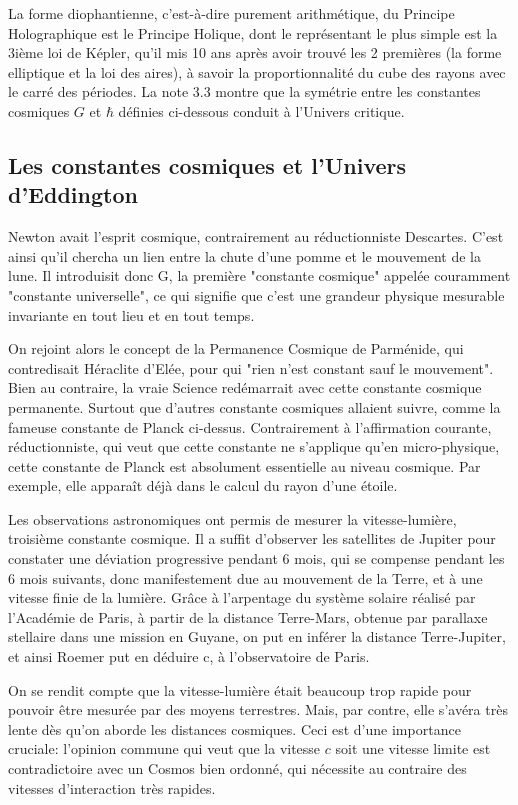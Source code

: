\documentclass[a4paper,12pt]{article}
\begin{document}
La forme diophantienne, c'est-à-dire purement arithmétique, du Principe Holographique est le Principe Holique, dont le représentant le plus simple est la 3ième loi de Képler, qu'il mis 10 ans après avoir trouvé les 2 premières (la forme elliptique et la loi des aires), à savoir la proportionnalité du cube des rayons avec le carré des périodes. La note 3.3 montre que la symétrie entre les constantes cosmiques $G$ et $\hbar$ définies ci-dessous conduit à l'Univers critique.

\subsection{Les constantes cosmiques et l'Univers d'Eddington}

Newton avait l'esprit cosmique, contrairement au réductionniste Descartes. C'est ainsi qu'il chercha un lien entre la chute d'une pomme et le mouvement de la lune. Il introduisit donc G, la première "constante cosmique" appelée couramment "constante universelle", ce qui signifie que c'est une grandeur physique mesurable invariante en tout lieu et en tout temps. 

On rejoint alors le concept de la Permanence Cosmique de Parménide, qui contredisait Héraclite d'Elée, pour qui "rien n'est constant sauf le mouvement". Bien au contraire, la vraie Science  redémarrait avec cette constante cosmique permanente. Surtout que d'autres constante cosmiques allaient suivre, comme la fameuse constante de Planck ci-dessus. Contrairement à l'affirmation courante, réductionniste, qui veut que cette constante ne s'applique qu'en micro-physique, cette constante de Planck est absolument essentielle au niveau cosmique. Par exemple, elle apparaît déjà dans le calcul du rayon d'une étoile.

Les observations astronomiques ont permis de mesurer la vitesse-lumière, troisième constante cosmique. Il a suffit d'observer les satellites de Jupiter pour constater une déviation progressive pendant 6 mois, qui se compense pendant les 6 mois suivants, donc manifestement due au mouvement de la Terre, et à une vitesse finie de la lumière. Grâce à l'arpentage du système solaire réalisé par l'Académie de Paris, à partir de la distance Terre-Mars, obtenue par parallaxe stellaire dans une mission en Guyane, on put en inférer la distance Terre-Jupiter, et ainsi Roemer put en déduire c, à l'observatoire de Paris.

On se rendit compte que la vitesse-lumière était beaucoup trop rapide pour pouvoir être mesurée par des moyens terrestres. Mais, par contre, elle s'avéra très lente dès qu'on aborde les distances cosmiques. Ceci est d'une importance cruciale: l'opinion commune qui veut que la vitesse $c$ soit une vitesse limite est contradictoire avec un Cosmos bien ordonné, qui nécessite au contraire des vitesses d'interaction très rapides.
\end{document}
